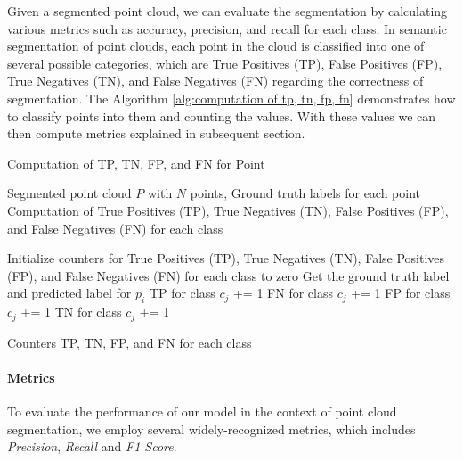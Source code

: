\documentclass[11pt, a4paper,oneside,chapterprefix=false]{scrbook}
\begin{document}
Given a segmented point cloud, we can evaluate the segmentation by calculating various metrics such as accuracy, precision, and recall for each class. In semantic segmentation of point clouds, each point in the cloud is classified into one of several possible categories, which are True Positives (TP), False Positives (FP), True Negatives (TN), and False Negatives (FN) regarding the correctness of segmentation. The Algorithm \ref{alg:computation of tp, tn, fp, fn} demonstrates how to classify points into them and counting the values. With these values we can then compute metrics explained in subsequent section.  

\begin{algorithm}[H]
\caption{Computation of TP, TN, FP, and FN for Point} \label{alg:computation of tp, tn, fp, fn}
\begin{algorithmic}[1]
\Require Segmented point cloud \(P\) with \(N\) points, Ground truth labels for each point
\Ensure Computation of True Positives (TP), True Negatives (TN), False Positives (FP), and False Negatives (FN) for each class

\State Initialize counters for True Positives (TP), True Negatives (TN), False Positives (FP), and False Negatives (FN) for each class to zero
    \State Get the ground truth label and predicted label for \(p_i\)
                \State TP for class \(c_j\) += 1
            \Else
                \State FN for class \(c_j\) += 1
            \EndIf
        \Else
                \State FP for class \(c_j\) += 1
            \Else
                \State TN for class \(c_j\) += 1
            \EndIf
        \EndIf
    \EndFor
\EndFor

\State \Return Counters TP, TN, FP, and FN for each class
\end{algorithmic}
\end{algorithm}

\paragraph{Metrics} \label{par:metrics}

To evaluate the performance of our model in the context of point cloud segmentation, we employ several widely-recognized metrics, which includes \emph{Precision}, \emph{Recall} and \emph{F1 Score}. 
\end{document}
